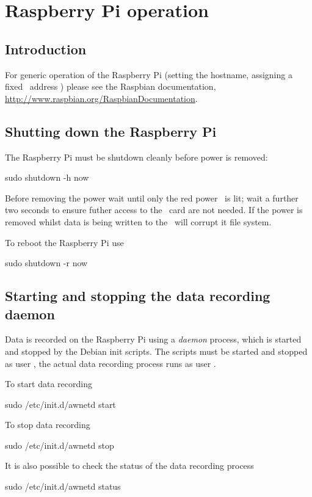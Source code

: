 \chapter{Raspberry Pi operation}

\section{Introduction}

For generic operation of the Raspberry Pi (setting the hostname,
assigning a fixed \ip\ address \etc) please see the Raspbian
documentation,
\url{http://www.raspbian.org/RaspbianDocumentation}.

\section{Shutting down the Raspberry Pi}

The Raspberry Pi must be shutdown cleanly before power is removed:
\begin{Cmd}
sudo shutdown -h now
\end{Cmd}
Before removing the power wait until only the red power \led\ is lit;
wait a further two seconds to ensure futher access to the \sd\ card
are not needed. If the power is removed whilst data is being written
to the \sd\ will corrupt it file system.


To reboot the Raspberry Pi use
\begin{Cmd}
sudo shutdown -r now
\end{Cmd}

\section{Starting and stopping the data recording daemon}

Data is recorded on the Raspberry Pi using a \emph{daemon} process,
which is started and stopped by the Debian init scripts. The scripts
must be started and stopped as user \rootUser, the actual data
recording process runs as user \piUser.

To start data recording
\begin{Cmd}
sudo /etc/init.d/awnetd start
\end{Cmd}

To stop data recording
\begin{Cmd}
sudo /etc/init.d/awnetd stop
\end{Cmd}

It is also possible to check the status of the data recording process
\begin{Cmd}
sudo /etc/init.d/awnetd status
\end{Cmd}

